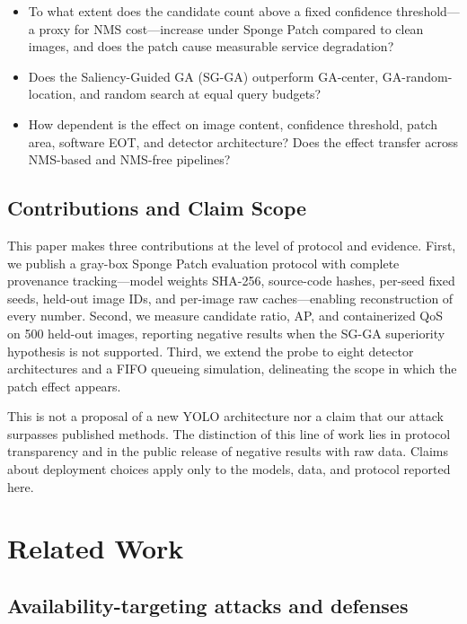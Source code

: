 \documentclass[a4paper,fleqn]{cas-dc}
\begin{document}
\begin{itemize}
    \item[\textbf{RQ1}] To what extent does the candidate count above a fixed confidence threshold---a proxy for NMS cost---increase under Sponge Patch compared to clean images, and does the patch cause measurable service degradation?
    \item[\textbf{RQ2}] Does the Saliency-Guided GA (SG-GA) outperform GA-center, GA-random-location, and random search at equal query budgets?
    \item[\textbf{RQ3}] How dependent is the effect on image content, confidence threshold, patch area, software EOT, and detector architecture? Does the effect transfer across NMS-based and NMS-free pipelines?
\end{itemize}

\subsection{Contributions and Claim Scope}

This paper makes three contributions at the level of protocol and evidence. First, we publish a gray-box Sponge Patch evaluation protocol with complete provenance tracking---model weights SHA-256, source-code hashes, per-seed fixed seeds, held-out image IDs, and per-image raw caches---enabling reconstruction of every number. Second, we measure candidate ratio, AP, and containerized QoS on 500 held-out images, reporting negative results when the SG-GA superiority hypothesis is not supported. Third, we extend the probe to eight detector architectures and a FIFO queueing simulation, delineating the scope in which the patch effect appears.

This is not a proposal of a new YOLO architecture nor a claim that our attack surpasses published methods. The distinction of this line of work lies in protocol transparency and in the public release of negative results with raw data. Claims about deployment choices apply only to the models, data, and protocol reported here.

\section{Related Work}

\subsection{Availability-targeting attacks and defenses}
\end{document}

